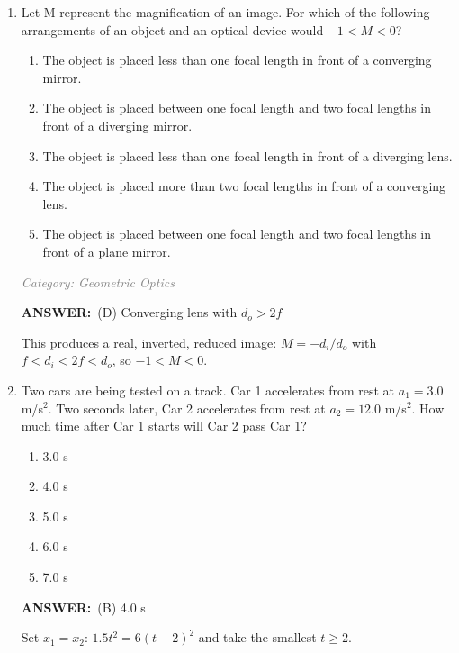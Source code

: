 \documentclass[12pt, a4paper]{article}
\makeatletter
\newcommand{\finalanswer}[1]{\textbf{ANSWER:}~#1}
\newif\if@categoryprinted
\newcommand{\category}[1]{\if@categoryprinted\relax\else\textit{\textcolor{gray}{Category: #1}}\global\@categoryprintedtrue\fi}
\newcommand{\tags}[1]{}
\makeatother
\begin{document}
\begin{CJK*}{UTF8}{gbsn}
\begin{enumerate}[itemsep=1.0em, topsep=0.6em]
\item \label{prob:34}
Let M represent the magnification of an image. For which of the following arrangements of an object and an optical device would $-1 < M < 0$? 
\begin{enumerate}[label=(\Alph*)]
    \item The object is placed less than one focal length in front of a converging mirror.
    \item The object is placed between one focal length and two focal lengths in front of a diverging mirror.
    \item The object is placed less than one focal length in front of a diverging lens.
    \item The object is placed more than two focal lengths in front of a converging lens.
    \item The object is placed between one focal length and two focal lengths in front of a plane mirror.
\end{enumerate}

\category{Geometric Optics} \tags{}
\begin{answerbox}
\finalanswer{(D) Converging lens with $d_o>2f$}
\end{answerbox}
\begin{solutionbox}

This produces a real, inverted, reduced image: $M=-d_i/d_o$ with $f<d_i<2f<d_o$, so $-1<M<0$.
\end{solutionbox}

\newpage

\item \label{prob:35}
Two cars are being tested on a track. Car 1 accelerates from rest at $a_1=3.0$ m/s$^2$. Two seconds later, Car 2 accelerates from rest at $a_2=12.0$ m/s$^2$. How much time after Car 1 starts will Car 2 pass Car 1?
\begin{enumerate}[label=(\Alph*)]
    \item 3.0 s
    \item 4.0 s
    \item 5.0 s
    \item 6.0 s
    \item 7.0 s
\end{enumerate}

\category{Kinematics} \tags{}
\begin{answerbox}
\finalanswer{(B) 4.0 s}
\end{answerbox}
\begin{insightbox}
Set $x_1=x_2$: $1.5t^2=6(t-2)^2$ and take the smallest $t\ge2$.
\end{insightbox}
\begin{solutionbox}


\end{solutionbox}
\end{enumerate}
\end{CJK*}
\end{document}
